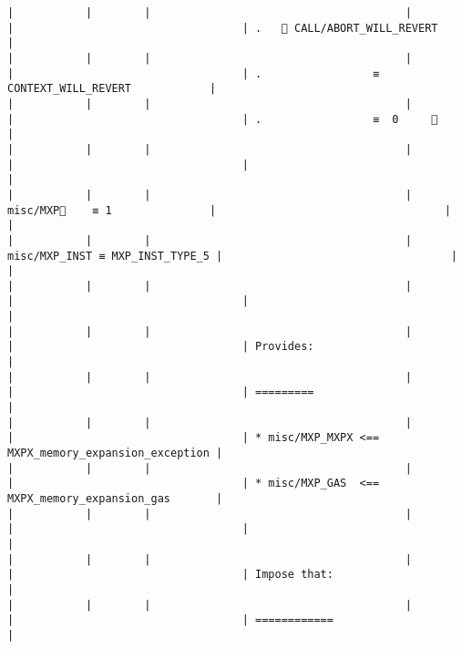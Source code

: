 \documentclass[varwidth=\maxdimen,margin=0.5cm,multi={verbatim}]{standalone}
\begin{document}
\begin{verbatim}
|           |        |                                       |                                 |                                   | .    CALL/ABORT_WILL_REVERT                        |
|           |        |                                       |                                 |                                   | .                 ≡  CONTEXT_WILL_REVERT            |
|           |        |                                       |                                 |                                   | .                 ≡  0     👋                       |
|           |        |                                       |                                 |                                   |                                                     |
|           |        |                                       | misc/MXP🚩    ≡ 1               |                                   |                                                     |
|           |        |                                       | misc/MXP_INST ≡ MXP_INST_TYPE_5 |                                   |                                                     |
|           |        |                                       |                                 |                                   |                                                     |
|           |        |                                       |                                 |                                   | Provides:                                           |
|           |        |                                       |                                 |                                   | =========                                           |
|           |        |                                       |                                 |                                   | * misc/MXP_MXPX <== MXPX_memory_expansion_exception |
|           |        |                                       |                                 |                                   | * misc/MXP_GAS  <== MXPX_memory_expansion_gas       |
|           |        |                                       |                                 |                                   |                                                     |
|           |        |                                       |                                 |                                   | Impose that:                                        |
|           |        |                                       |                                 |                                   | ============                                        |

\end{verbatim}
\end{document}
